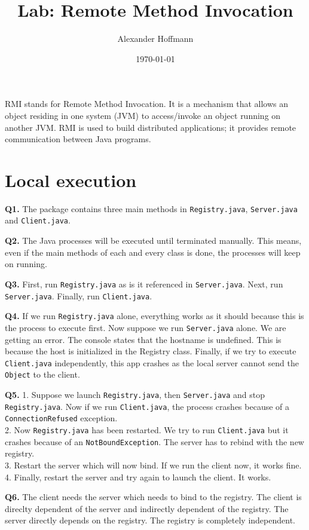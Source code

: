 \documentclass[12pt]{extarticle}
\title{Lab: Remote Method Invocation}
\author{Alexander Hoffmann}
\date{\today}
\begin{document}
\maketitle

RMI stands for Remote Method Invocation. It is a mechanism that allows an object residing in one system (JVM) to access/invoke an object running on another JVM. RMI is used to build distributed applications; it provides remote communication between Java programs.

\section{Local execution}
\textbf{Q1.} The package contains three main methods in \texttt{Registry.java}, \texttt{Server.java} and \texttt{Client.java}.

\textbf{Q2.} The Java processes will be executed until terminated manually. This means, even if the main methods of each and every class is done, the processes will keep on running.

\textbf{Q3.} First, run \texttt{Registry.java} as is it referenced in \texttt{Server.java}. Next, run \texttt{Server.java}. Finally, run \texttt{Client.java}.

\textbf{Q4.} If we run \texttt{Registry.java} alone, everything works as it should because this is the process to execute first. Now suppose we run \texttt{Server.java} alone. We are getting an error. The console states that the hostname is undefined. This is because the host is initialized in the Registry class. Finally, if we try to execute \texttt{Client.java} independently, this app crashes as the local server cannot send the \texttt{Object} to the client.

\textbf{Q5.} 1. Suppose we launch \texttt{Registry.java}, then \texttt{Server.java} and stop \texttt{Registry.java}. Now if we run \texttt{Client.java}, the process crashes because of a \texttt{ConnectionRefused} exception.\\
2. Now \texttt{Registry.java} has been restarted. We try to run \texttt{Client.java} but it crashes because of an \texttt{NotBoundException}. The server has to rebind with the new registry.\\
3. Restart the server which will now bind. If we run the client now, it works fine.\\
4. Finally, restart the server and try again to launch the client. It works.

\textbf{Q6.} The client needs the server which needs to bind to the registry. The client is direclty dependent of the server and indirectly dependent of the registry. The server directly depends on the registry. The registry is completely independent.
\end{document}
